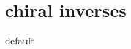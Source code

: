 \section{chiral inverses}

\begin{table}[htdp]
\begin{center}
\begin{tabular}{llll}

\end{tabular}
\end{center}
\label{tab:08:experiment:a}
\caption{default}
\end{table}%

\endinput